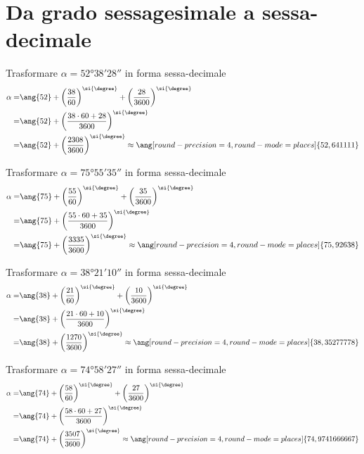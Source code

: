 \section{Da grado sessagesimale a sessa-decimale}
 \begin{exercise}
Trasformare $\alpha=\ang{52;38;28}$ in forma sessa-decimale
\tcblower
\begin{align*}
\alpha=&\ang{52}+\left(\dfrac{38}{60}\right)^{\si{\degree} }+\left(\dfrac{28}{3600}\right)^{\si{\degree} }\\
=&\ang{52}+\left(\dfrac{38\cdot60+28}{3600}\right)^{\si{\degree} }\\
=&\ang{52}+\left(\dfrac{2308}{3600}\right)^{\si{\degree} }\approx\ang[round-precision=\lungarrotandamento,round-mode=places]{52,641111}
\end{align*}
\end{exercise}
 \begin{exercise}
 	Trasformare  $\alpha=\ang{75;55;35}$ in forma sessa-decimale
 	\tcblower
 	\begin{align*}
 	\alpha=&\ang{75}+\left(\dfrac{55}{60}\right)^{\si{\degree} }+\left(\dfrac{35}{3600}\right)^{\si{\degree} }\\
 	=&\ang{75}+\left(\dfrac{55\cdot60+35}{3600}\right)^{\si{\degree}}\\
 	=&\ang{75}+\left(\dfrac{3335}{3600}\right)^{\si{\degree}}\approx\ang[round-precision=\lungarrotandamento,round-mode=places]{75,92638}
 	\end{align*}
 \end{exercise}
  \begin{exercise}
  	Trasformare  $\alpha=\ang{38;21;10}$ in forma sessa-decimale
  	\tcblower
  	\begin{align*}
  	\alpha=&\ang{38}+\left(\dfrac{21}{60}\right)^{\si{\degree} }+\left(\dfrac{10}{3600}\right)^{\si{\degree} }\\
  	=&\ang{38}+\left(\dfrac{21\cdot60+10}{3600}\right)^{\si{\degree}}\\
  	=&\ang{38}+\left(\dfrac{1270}{3600}\right)^{\si{\degree}}\approx\ang[round-precision=\lungarrotandamento,round-mode=places]{38,35277778}
  	\end{align*}
  \end{exercise}
  \begin{exercise}
  	Trasformare  $\alpha=\ang{74;58;27}$ in forma sessa-decimale
  	\tcblower
  	\begin{align*}
  	\alpha=&\ang{74}+\left(\dfrac{58}{60}\right)^{\si{\degree} }+\left(\dfrac{27}{3600}\right)^{\si{\degree} }\\
  	=&\ang{74}+\left(\dfrac{58\cdot60+27}{3600}\right)^{\si{\degree}}\\
  	=&\ang{74}+\left(\dfrac{3507}{3600}\right)^{\si{\degree}}\approx\ang[round-precision=\lungarrotandamento,round-mode=places]{74,9741666667}
  	\end{align*}
  \end{exercise}
